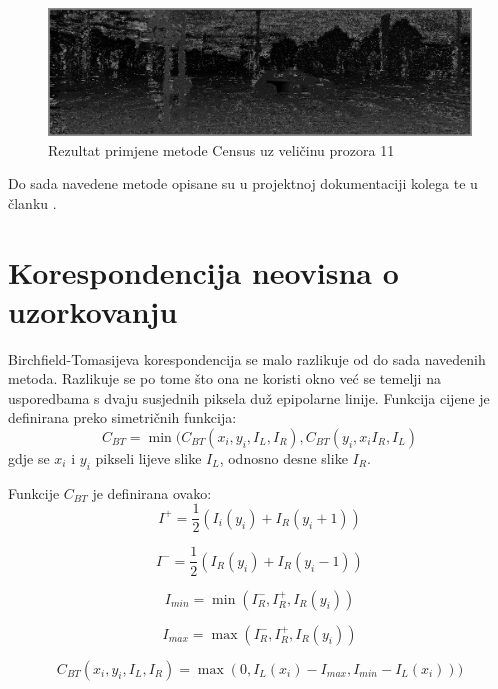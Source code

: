 \documentclass[utf8, zavrsni, numeric]{fer}
\begin{document}
\begin{figure}[htb]
  \centering
  \includegraphics[width=14cm]{img/local_000046_10_Census_11_140.png}
  \caption{Rezultat primjene metode Census uz veličinu prozora 11}
  \label{fig:Census-KITTI}
\end{figure}

Do sada navedene metode opisane su u projektnoj dokumentaciji kolega \cite{projekt1415} te u članku \cite{hirschmuller2007evaluation}.

\section{Korespondencija neovisna o uzorkovanju}

Birchfield-Tomasijeva korespondencija se malo razlikuje od do sada navedenih metoda.
Razlikuje se po tome što ona ne koristi okno već se temelji na usporedbama s dvaju susjednih piksela duž epipolarne linije.
Funkcija cijene je definirana preko simetričnih funkcija:
\[
C_{BT} = \min(C_{BT}(x_i, y_i, I_L, I_R), C_{BT}(y_i, x_i I_R, I_L)
\]
gdje se $x_i$ i $y_i$ pikseli lijeve slike $I_L$, odnosno desne slike $I_R$.

Funkcije $C_{BT}$ je definirana ovako:
\begin{equation}
I^+ = \frac{1}{2}(I_i(y_i) + I_R(y_i + 1))
\end{equation}

\begin{equation}
I^- = \frac{1}{2}(I_R(y_i) + I_R(y_i - 1))
\end{equation}

\begin{equation}
I_{min} = \min(I^-_R, I^+_R, I_R(y_i))
\end{equation}

\begin{equation}
I_{max} = \max(I^-_R, I^+_R, I_R(y_i))
\end{equation}

\begin{equation}
C_{BT}(x_i, y_i, I_L, I_R) = \max(0, I_L(x_i) - I_{max}, I_{min} - I_L(x_i)))
\end{equation}
\end{document}
